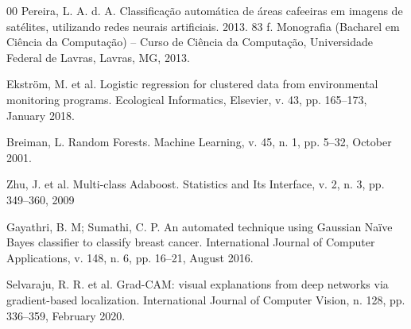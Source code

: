 \documentclass[final,5p,times,twocolumn]{elsarticle}
\begin{document}
\begin{thebibliography}{00}
Pereira, L. A. d. A. Classificação automática de áreas cafeeiras em imagens de satélites, utilizando redes neurais artificiais. 2013. 83 f. Monografia (Bacharel em Ciência da Computação) – Curso de Ciência da Computação, Universidade Federal de Lavras, Lavras, MG, 2013.

Ekström, M. et al. Logistic regression for clustered data from environmental monitoring programs. Ecological Informatics, Elsevier, v. 43, pp. 165--173, January 2018.

Breiman, L. Random Forests. Machine Learning, v. 45, n. 1, pp. 5--32, October 2001.

Zhu, J. et al. Multi-class Adaboost. Statistics and Its Interface, v. 2, n. 3, pp. 349--360, 2009 

Gayathri, B. M; Sumathi, C. P. An automated technique using Gaussian Naïve Bayes classifier to classify breast cancer. International Journal of Computer Applications, v. 148, n. 6, pp. 16--21, August 2016.

Selvaraju, R. R. et al. Grad-CAM: visual explanations from deep networks via gradient-based localization. International Journal of Computer Vision, n. 128, pp. 336--359, February 2020.


\end{thebibliography}
\end{document}
